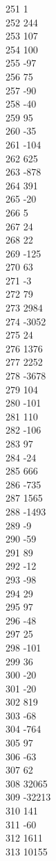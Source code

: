 { 251	1 \\
 252	244 \\
 253	107 \\
 254	100 \\
 255	-97 \\
 256	75 \\
 257	-90 \\
 258	-40 \\
 259	95 \\
 260	-35 \\
 261	-104 \\
 262	625 \\
 263	-878 \\
 264	391 \\
 265	-20 \\
 266	5 \\
 267	24 \\
 268	22 \\
 269	-125 \\
 270	63 \\
 271	-3 \\
 272	79 \\
 273	2984 \\
 274	-3052 \\
 275	24 \\
 276	1376 \\
 277	2252 \\
 278	-3678 \\
 279	104 \\
 280	-101 \\
 281	110 \\
 282	-106 \\
 283	97 \\
 284	-24 \\
 285	666 \\
 286	-735 \\
 287	1565 \\
 288	-1493 \\
 289	-9 \\
 290	-59 \\
 291	89 \\
 292	-12 \\
 293	-98 \\
 294	29 \\
 295	97 \\
 296	-48 \\
 297	25 \\
 298	-101 \\
 299	36 \\
 300	-20 \\
 301	-20 \\
 302	819 \\
 303	-68 \\
 304	-764 \\
 305	97 \\
 306	-63 \\
 307	62 \\
 308	32065 \\
 309	-32213 \\
 310	141 \\
 311	-60 \\
 312	1611 \\
 313	10155 \\
}
